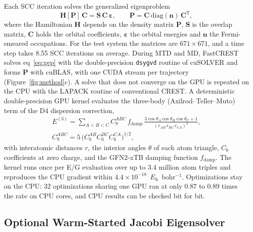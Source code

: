 \documentclass[journal=jctcce,manuscript=article]{achemso}
\newcommand{\Eh}{\ensuremath{E_\mathrm{h}}}
\begin{document}
Each SCC iteration solves the generalized eigenproblem
\begin{equation}
\mathbf{H}[\mathbf{P}]\,\mathbf{C} = \mathbf{S}\,\mathbf{C}\,\boldsymbol{\varepsilon}, \qquad \mathbf{P} = \mathbf{C}\,\mathrm{diag}(\mathbf{n})\,\mathbf{C}^{\mathsf{T}},
\label{eq:gep}
\end{equation}
where the Hamiltonian $\mathbf{H}$ depends on the density matrix $\mathbf{P}$, $\mathbf{S}$ is the overlap matrix, $\mathbf{C}$ holds the orbital coefficients, $\boldsymbol{\varepsilon}$ the orbital energies and $\mathbf{n}$ the Fermi-smeared occupations. For the test system the matrices are $671\times671$, and a time step takes 8.55 SCC iterations on average. During MTD and MD, FastCREST solves eq~\ref{eq:gep} with the double-precision \texttt{dsygvd} routine of cuSOLVER\cite{cusolver} and forms $\mathbf{P}$ with cuBLAS,\cite{cublas} with one CUDA stream per trajectory (Figure~\ref{fig:method}c). A solve that does not converge on the GPU is repeated on the CPU with the LAPACK routine of conventional CREST. A deterministic double-precision GPU kernel evaluates the three-body (Axilrod--Teller--Muto) term of the D4 dispersion correction,\cite{axilrod1943,muto1943,caldeweyher2019}
\begin{equation}
\begin{gathered}
E^{(3)} = \sum_{A<B<C} C_9^{ABC}\, f_\mathrm{damp}\,
\frac{3\cos\theta_A\cos\theta_B\cos\theta_C + 1}{(r_{AB}\,r_{BC}\,r_{CA})^3}, \\
C_9^{ABC} = 5\,\bigl(C_6^{AB} C_6^{BC} C_6^{CA}\bigr)^{1/2},
\end{gathered}
\label{eq:atm}
\end{equation}
with interatomic distances $r$, the interior angles $\theta$ of each atom triangle, $C_6$ coefficients at zero charge, and the GFN2-xTB damping function $f_\mathrm{damp}$.\cite{gfn2} The kernel runs once per E/G evaluation over up to 3.4 million atom triples and reproduces the CPU gradient within $4.4\times10^{-18}$~\Eh~bohr$^{-1}$. Optimizations stay on the CPU: 32 optimizations sharing one GPU ran at only 0.87 to 0.89 times the rate on CPU cores, and CPU results can be checked bit for bit.

\subsection{Optional Warm-Started Jacobi Eigensolver}
\label{sec:jacobi}
\end{document}
